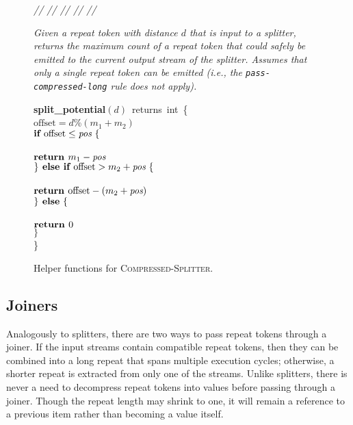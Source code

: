 \begin{figure}[t]
\begin{minipage}{0.1in}
\vspace{-1.75pt}
{\it // // // // //}
\end{minipage}
\begin{minipage}{3.23in}
{\it Given a repeat token with distance $d$ that is input to a
  splitter, returns the maximum count of a repeat token that could
  safely be emitted to the current output stream of the splitter.
  Assumes that only a single repeat token can be emitted (i.e., the
  {\tt pass-compressed-long} rule does not apply).}
\end{minipage}
\mbox{\bf split\_potential}$(d)$~returns~int~\{\\
\tab$\mbox{offset} = d$\%$(m_1 + m_2)$\\
\tab$\mbox{{\bf if~}} \mbox{offset} \leq \mbox{\it pos} ~\{$\\
\tab{}\\
\tab\tab$\mbox{\bf return~} m_1 - \mbox{\it pos}$\\
\tab$\} \mbox{\bf ~else if~} \mbox{offset} > m_2 + \mbox{\it pos} ~\{$\\
\tab{}\\
\tab\tab$\mbox{\bf return~} \mbox{offset} - (m_2 + \mbox{\it pos})$\\
\tab$\} \mbox{\bf ~else} ~\{$\\
\tab{}\\
\tab\tab$\mbox{\bf return~} 0$\\
\tab$\}$\\
\}
\caption{Helper functions for \textsc{Compressed-Splitter}.
\protect\label{fig:helper-splitter}}
\end{figure}

\subsection{Joiners}

Analogously to splitters, there are two ways to pass repeat tokens
through a joiner.  If the input streams contain compatible repeat
tokens, then they can be combined into a long repeat that spans
multiple execution cycles; otherwise, a shorter repeat is extracted
from only one of the streams.  Unlike splitters, there is never a need
to decompress repeat tokens into values before passing through a
joiner.  Though the repeat length may shrink to one, it will remain a
reference to a previous item rather than becoming a value itself.


